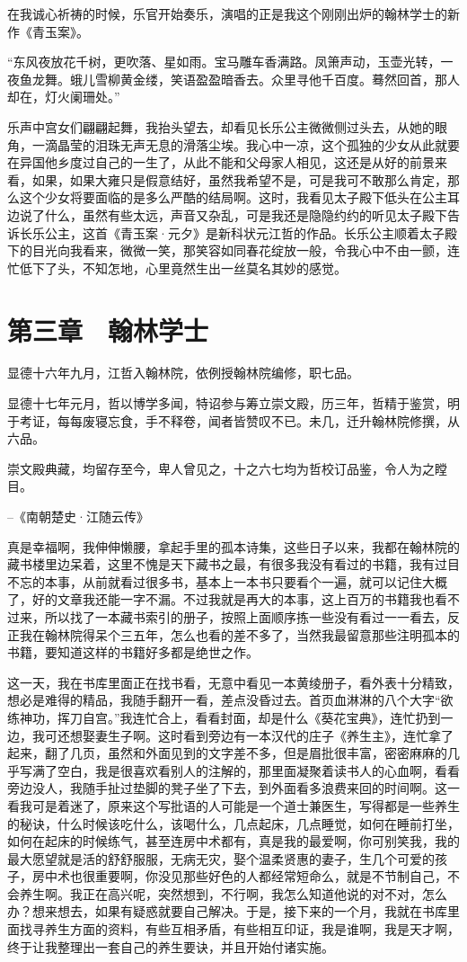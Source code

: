 在我诚心祈祷的时候，乐官开始奏乐，演唱的正是我这个刚刚出炉的翰林学士的新作《青玉案》。

“东风夜放花千树，更吹落、星如雨。宝马雕车香满路。凤箫声动，玉壶光转，一夜鱼龙舞。蛾儿雪柳黄金缕，笑语盈盈暗香去。众里寻他千百度。蓦然回首，那人却在，灯火阑珊处。”

乐声中宫女们翩翩起舞，我抬头望去，却看见长乐公主微微侧过头去，从她的眼角，一滴晶莹的泪珠无声无息的滑落尘埃。我心中一凉，这个孤独的少女从此就要在异国他乡度过自己的一生了，从此不能和父母家人相见，这还是从好的前景来看，如果，如果大雍只是假意结好，虽然我希望不是，可是我可不敢那么肯定，那么这个少女将要面临的是多么严酷的结局啊。这时，我看见太子殿下低头在公主耳边说了什么，虽然有些太远，声音又杂乱，可是我还是隐隐约约的听见太子殿下告诉长乐公主，这首《青玉案·元夕》是新科状元江哲的作品。长乐公主顺着太子殿下的目光向我看来，微微一笑，那笑容如同春花绽放一般，令我心中不由一颤，连忙低下了头，不知怎地，心里竟然生出一丝莫名其妙的感觉。

\chapter{第三章　翰林学士}

显德十六年九月，江哲入翰林院，依例授翰林院编修，职七品。

显德十七年元月，哲以博学多闻，特诏参与筹立崇文殿，历三年，哲精于鉴赏，明于考证，每每废寝忘食，手不释卷，闻者皆赞叹不已。未几，迁升翰林院修撰，从六品。

崇文殿典藏，均留存至今，卑人曾见之，十之六七均为哲校订品鉴，令人为之瞠目。

--《南朝楚史·江随云传》

真是幸福啊，我伸伸懒腰，拿起手里的孤本诗集，这些日子以来，我都在翰林院的藏书楼里边呆着，这里不愧是天下藏书之最，有很多我没有看过的书籍，我有过目不忘的本事，从前就看过很多书，基本上一本书只要看个一遍，就可以记住大概了，好的文章我还能一字不漏。不过我就是再大的本事，这上百万的书籍我也看不过来，所以找了一本藏书索引的册子，按照上面顺序拣一些没有看过一一看去，反正我在翰林院得呆个三五年，怎么也看的差不多了，当然我最留意那些注明孤本的书籍，要知道这样的书籍好多都是绝世之作。

这一天，我在书库里面正在找书看，无意中看见一本黄绫册子，看外表十分精致，想必是难得的精品，我随手翻开一看，差点没昏过去。首页血淋淋的八个大字“欲练神功，挥刀自宫。”我连忙合上，看看封面，却是什么《葵花宝典》，连忙扔到一边，我可还想娶妻生子啊。这时看到旁边有一本汉代的庄子《养生主》，连忙拿了起来，翻了几页，虽然和外面见到的文字差不多，但是眉批很丰富，密密麻麻的几乎写满了空白，我是很喜欢看别人的注解的，那里面凝聚着读书人的心血啊，看看旁边没人，我随手扯过垫脚的凳子坐了下去，到外面看多浪费来回的时间啊。这一看我可是着迷了，原来这个写批语的人可能是一个道士兼医生，写得都是一些养生的秘诀，什么时候该吃什么，该喝什么，几点起床，几点睡觉，如何在睡前打坐，如何在起床的时候练气，甚至连房中术都有，真是我的最爱啊，你可别笑我，我的最大愿望就是活的舒舒服服，无病无灾，娶个温柔贤惠的妻子，生几个可爱的孩子，房中术也很重要啊，你没见那些好色的人都经常短命么，就是不节制自己，不会养生啊。我正在高兴呢，突然想到，不行啊，我怎么知道他说的对不对，怎么办？想来想去，如果有疑惑就要自己解决。于是，接下来的一个月，我就在书库里面找寻养生方面的资料，有些互相矛盾，有些相互印证，我是谁啊，我是天才啊，终于让我整理出一套自己的养生要诀，并且开始付诸实施。

